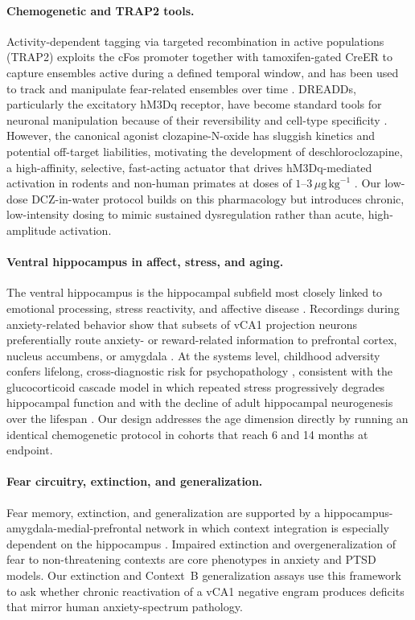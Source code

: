 \documentclass[11pt]{article}
\begin{document}
\paragraph{Chemogenetic and TRAP2 tools.}
Activity-dependent tagging via targeted recombination in active populations (TRAP2) exploits the cFos promoter together with tamoxifen-gated CreER to capture ensembles active during a defined temporal window, and has been used to track and manipulate fear-related ensembles over time \citep{denardo2019temporal}. DREADDs, particularly the excitatory hM3Dq receptor, have become standard tools for neuronal manipulation because of their reversibility and cell-type specificity \citep{roth2016dreadds}. However, the canonical agonist clozapine-N-oxide has sluggish kinetics and potential off-target liabilities, motivating the development of deschloroclozapine, a high-affinity, selective, fast-acting actuator that drives hM3Dq-mediated activation in rodents and non-human primates at doses of $1$--$3\,\mu\mathrm{g}\,\mathrm{kg}^{-1}$ \citep{nagai2020dcz}. Our low-dose DCZ-in-water protocol builds on this pharmacology but introduces chronic, low-intensity dosing to mimic sustained dysregulation rather than acute, high-amplitude activation.

\paragraph{Ventral hippocampus in affect, stress, and aging.}
The ventral hippocampus is the hippocampal subfield most closely linked to emotional processing, stress reactivity, and affective disease \citep{fanselow2010ventral}. Recordings during anxiety-related behavior show that subsets of vCA1 projection neurons preferentially route anxiety- or reward-related information to prefrontal cortex, nucleus accumbens, or amygdala \citep{ciocchi2015vca1}. At the systems level, childhood adversity confers lifelong, cross-diagnostic risk for psychopathology \citep{kessler2010childhood}, consistent with the glucocorticoid cascade model in which repeated stress progressively degrades hippocampal function \citep{sapolsky1986glucocorticoid} and with the decline of adult hippocampal neurogenesis over the lifespan \citep{klempin2007neurogenesis}. Our design addresses the age dimension directly by running an identical chemogenetic protocol in cohorts that reach 6 and 14 months at endpoint.

\paragraph{Fear circuitry, extinction, and generalization.}
Fear memory, extinction, and generalization are supported by a hippocampus-amygdala-medial-prefrontal network in which context integration is especially dependent on the hippocampus \citep{maren2013contextual,tovote2015circuits}. Impaired extinction and overgeneralization of fear to non-threatening contexts are core phenotypes in anxiety and PTSD models. Our extinction and Context~B generalization assays use this framework to ask whether chronic reactivation of a vCA1 negative engram produces deficits that mirror human anxiety-spectrum pathology.
\end{document}
